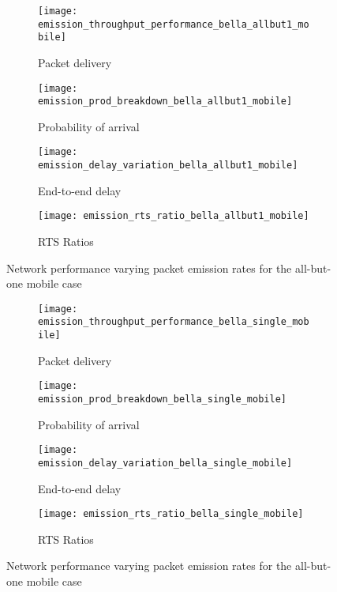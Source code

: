 \begin{figure}[tp!]
  \begin{subfigure}[t]{0.5\textwidth}
    \centering
    \texttt{[image: emission\_throughput\_performance\_bella\_allbut1\_mobile]}
    \caption{Packet delivery}
    \label{fig:emission_throughput_performance_bella_allbut1_mobile}
  \end{subfigure}
  \begin{subfigure}[t]{0.5\textwidth}
    \centering
    \texttt{[image: emission\_prod\_breakdown\_bella\_allbut1\_mobile]}
    \caption{Probability of arrival}
    \label{fig:emission_prod_breakdown_bella_allbut1_mobile}
  \end{subfigure}

  \begin{subfigure}[t]{0.5\textwidth}
    \centering
    \texttt{[image: emission\_delay\_variation\_bella\_allbut1\_mobile]}
    \caption{End-to-end delay}
    \label{fig:emission_delay_variation_bella_allbut1_mobile}
  \end{subfigure}
  \begin{subfigure}[t]{0.5\textwidth}
    \centering
    \texttt{[image: emission\_rts\_ratio\_bella\_allbut1\_mobile]}
    \caption{RTS Ratios}
    \label{fig:emission_rts_ratio_bella_allbut1_mobile}
  \end{subfigure}
  \caption{Network performance varying packet emission rates for the all-but-one mobile case}
  \label{fig:emission_bella_allbut1_mobile}
\end{figure}

\begin{figure}[bp!]
  \begin{subfigure}[t]{0.5\textwidth}
    \centering
    \texttt{[image: emission\_throughput\_performance\_bella\_single\_mobile]}
    \caption{Packet delivery}
    \label{fig:emission_throughput_performance_bella_single_mobile}
  \end{subfigure}
  \begin{subfigure}[t]{0.5\textwidth}
    \centering
    \texttt{[image: emission\_prod\_breakdown\_bella\_single\_mobile]}
    \caption{Probability of arrival}
    \label{fig:emission_prod_breakdown_bella_single_mobile}
  \end{subfigure}

  \begin{subfigure}[t]{0.5\textwidth}
    \centering
    \texttt{[image: emission\_delay\_variation\_bella\_single\_mobile]}
    \caption{End-to-end delay}
    \label{fig:emission_delay_variation_bella_single_mobile}
  \end{subfigure}
  \begin{subfigure}[t]{0.5\textwidth}
    \centering
    \texttt{[image: emission\_rts\_ratio\_bella\_single\_mobile]}
    \caption{RTS Ratios}
    \label{fig:emission_rts_ratio_bella_single_mobile}
  \end{subfigure}
  \caption{Network performance varying packet emission rates for the all-but-one mobile case}
  \label{fig:emission_bella_single_mobile}
\end{figure}


